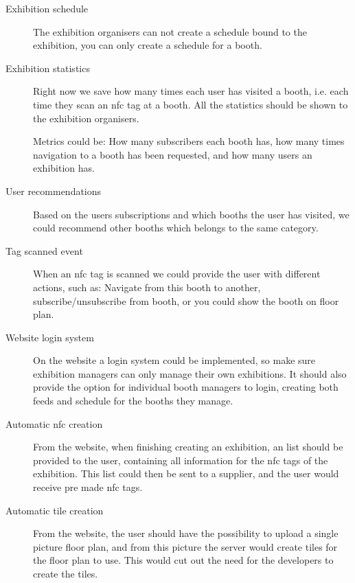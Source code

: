 \begin{description}
\item[Exhibition schedule] The exhibition organisers can not create a schedule bound to the exhibition, you can only create a schedule for a booth.%
\item[Exhibition statistics] Right now we save how many times each user has visited a booth, i.e. each time they scan an \ac{nfc} tag at a booth. All the statistics should be shown to the exhibition organisers.

Metrics could be: How many subscribers each booth has, how many times navigation to a booth has been requested, and how many users an exhibition has.
\item[User recommendations] Based on the users subscriptions and which booths the user has visited, we could recommend other booths which belongs to the same category.
\item[Tag scanned event] When an \ac{nfc} tag is scanned we could provide the user with different actions, such as: Navigate from this booth to another, subscribe/unsubscribe from booth, or you could show the booth on floor plan.
\item[Website login system] On the website a login system could be implemented, so make sure exhibition managers can only manage their own exhibitions. It should also provide the option for individual booth managers to login, creating both feeds and schedule for the booths they manage.
\item[Automatic \ac{nfc} creation] From the website, when finishing creating an exhibition, an list should be provided to the user, containing all information for the \ac{nfc} tags of the exhibition. This list could then be sent to a supplier, and the user would receive pre made \ac{nfc} tags.
\item[Automatic tile creation] From the website, the user should have the possibility to upload a single picture floor plan, and from this picture the server would create tiles for the floor plan to use. This would cut out the need for the developers to create the tiles.
\end{description}

